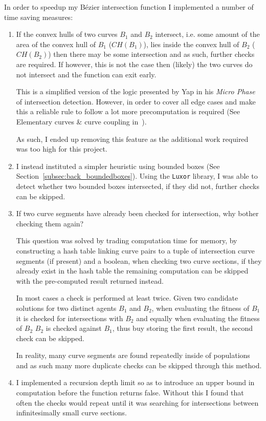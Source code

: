 In order to speedup my Bézier intersection function I implemented a number of time saving measures:

\begin{enumerate}
  \item If the convex hulls of two curves $B_{1}$ and $B_{2}$ intersect, i.e. some amount of the area of the convex hull of $B_{1}$ ($CH(B_{1})$), lies inside the convex hull of $B_{2}$ ($CH(B_{2})$) then there may  be some intersection and as such, further checks are required. If however, this is not the case then (likely) the two curves do not intersect and the function can exit early.

        This is a simplified version of the logic presented by Yap in his \textit{Micro Phase} of intersection detection. However, in order to cover all edge cases and make this a reliable rule to follow a lot more precomputation is required (See Elementary curves \& curve coupling in~\cite{yapCompleteSubdivisionAlgorithms2006}).

        As such, I ended up removing this feature as the additional work required was too high for this project.
    \item I instead instituted a simpler heuristic using bounded boxes (See Section~\ref{subsec:back_boundedboxes}). Using the \texttt{Luxor} library\cite{JuliaGraphicsLuxorJl2021}, I was able to detect whether two bounded boxes intersected, if they did not, further checks can be skipped.
  \item If two curve segments have already been checked for intersection, why bother checking them again?

        This question was solved by trading computation time for memory, by constructing a hash table linking curve pairs to a tuple of intersection curve segments (if present) and a boolean, when checking two curve sections, if they already exist in the hash table the remaining computation can be skipped with the pre-computed result returned instead.

        In most cases a check is performed at least twice. Given two candidate solutions for two distinct agents $B_{1}$ and $B_{2}$, when evaluating the fitness of $B_{1}$ it is checked for intersections with $B_{2}$ and equally when evaluating the fitness of $B_{2}$ $B_{2}$ is checked against $B_{1}$, thus buy storing the first result, the second check can be skipped.

        In reality, many curve segments are found repeatedly inside of populations and as such many more duplicate checks can be skipped through this method.
  \item I implemented a recursion depth limit so as to introduce an upper bound in computation before the function returns false. Without this I found that often the checks would repeat until it was searching for intersections between infinitesimally small curve sections.


\end{enumerate}
